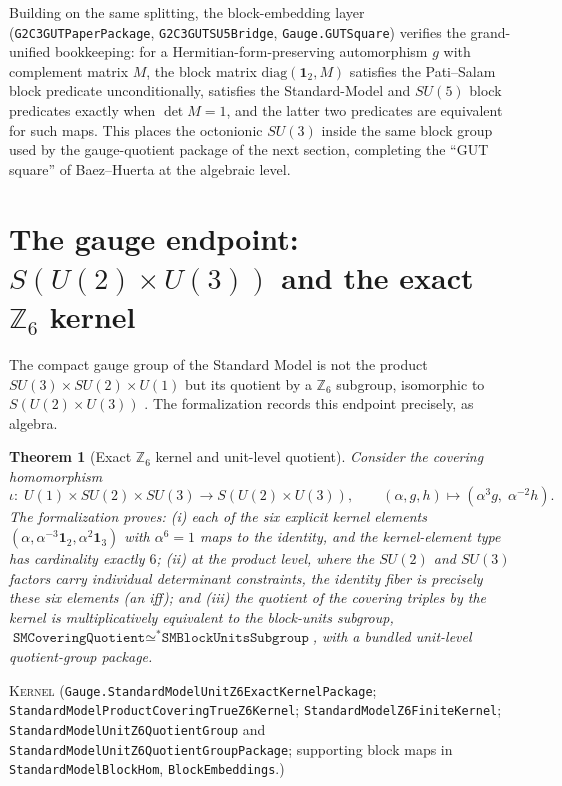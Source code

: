 \documentclass[11pt]{article}
\newcommand{\id}{\mathbf{1}}
\newcommand{\Kernel}{\textcolor{kernelcolor}{\textsc{Kernel}}}
\newcommand{\leanname}[1]{\texttt{#1}}
\newtheorem{theorem}{Theorem}
\begin{document}
Building on the same splitting, the block-embedding layer
(\leanname{G2C3GUTPaperPackage}, \leanname{G2C3GUTSU5Bridge},
\leanname{Gauge.GUTSquare}) verifies the grand-unified bookkeeping: for a
Hermitian-form-preserving automorphism $g$ with complement matrix $M$,
the block matrix $\mathrm{diag}(\id_2, M)$ satisfies the Pati--Salam
block predicate unconditionally, satisfies the Standard-Model and
$SU(5)$ block predicates exactly when $\det M = 1$, and the latter two
predicates are equivalent for such maps.  This places the octonionic
$SU(3)$ inside the same block group used by the gauge-quotient package of
the next section, completing the ``GUT square'' of
Baez--Huerta \cite{BaezHuerta2009} at the algebraic level.

\section{The gauge endpoint: $S(U(2)\times U(3))$ and the exact
$\mathbb{Z}_6$ kernel}
\label{sec:gauge}

The compact gauge group of the Standard Model is not the product
$SU(3)\times SU(2)\times U(1)$ but its quotient by a $\mathbb{Z}_6$
subgroup, isomorphic to $S(U(2)\times U(3))$
\cite{BaezHuerta2009}.  The formalization records this endpoint
precisely, as algebra.

\begin{theorem}[Exact $\mathbb{Z}_6$ kernel and unit-level quotient]
\label{thm:z6}
Consider the covering homomorphism
\[
\iota:\; U(1)\times SU(2)\times SU(3) \longrightarrow S(U(2)\times U(3)),
\qquad
(\alpha, g, h) \longmapsto (\alpha^3 g,\; \alpha^{-2} h).
\]
The formalization proves: (i) each of the six explicit kernel elements
$(\alpha, \alpha^{-3}\id_2, \alpha^{2}\id_3)$ with $\alpha^6 = 1$ maps to
the identity, and the kernel-element type has cardinality exactly $6$;
(ii) at the product level, where the $SU(2)$ and $SU(3)$ factors carry
individual determinant constraints, the identity fiber is
\emph{precisely} these six elements (an iff); and (iii) the quotient of
the covering triples by the kernel is multiplicatively equivalent to the
block-units subgroup,
$\leanname{SMCoveringQuotient} \simeq^* \leanname{SMBlockUnitsSubgroup}$,
with a bundled unit-level quotient-group package.
\end{theorem}
\noindent\Kernel{}\quad
(\leanname{Gauge.StandardModelUnitZ6ExactKernelPackage};
\leanname{StandardModelProductCoveringTrueZ6Kernel};
\leanname{StandardModelZ6FiniteKernel};
\leanname{StandardModelUnitZ6QuotientGroup} and
\leanname{StandardModelUnitZ6QuotientGroupPackage};
supporting block maps in \leanname{StandardModelBlockHom},
\leanname{BlockEmbeddings}.)
\end{document}
